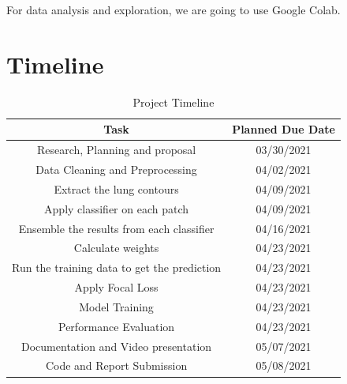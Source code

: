 \documentclass{sigkddExp}
\begin{document}
For data analysis and exploration, we are going to use Google Colab.


\section{Timeline}


\begin{table}[H]
    \centering
    \caption{Project Timeline}
    \begin{tabular}{|c|c|} \hline
        Task                                        & Planned Due Date \\ \hline
        Research, Planning and proposal             & 03/30/2021       \\ \hline
        Data Cleaning and Preprocessing             & 04/02/2021       \\ \hline
        Extract the lung contours                   & 04/09/2021       \\ \hline
        Apply classifier on each patch              & 04/09/2021       \\ \hline
        Ensemble the results from each classifier   & 04/16/2021       \\ \hline
        Calculate weights                           & 04/23/2021       \\ \hline
        Run the training data to get the prediction & 04/23/2021       \\ \hline
        Apply Focal Loss                            & 04/23/2021       \\ \hline
        Model Training                              & 04/23/2021       \\ \hline
        Performance Evaluation                      & 04/23/2021       \\ \hline
        Documentation and Video presentation        & 05/07/2021       \\ \hline
        Code and Report Submission                  & 05/08/2021       \\
        \hline\end{tabular}
\end{table}



%

\end{document}

